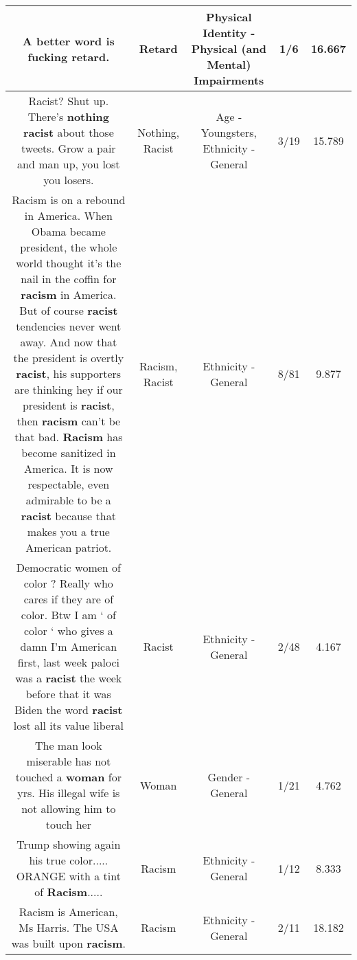 \documentclass[11pt]{article}
\newlength\mylength
\begin{document}
\begin{center}
\begin{longtable}{|C{.65\mylength}|C{.30\mylength}|C{.12\mylength}|C{.12\mylength}|C{.12\mylength}|}
  \small A better word is fucking \textbf{retard}.\normalsize   & Retard & Physical Identity - Physical (and Mental) Impairments & 1/6 & 16.667 \\  \hline
  \small Racist? Shut up. There's \textbf{nothing} \textbf{racist} about those tweets. Grow a pair and man up, you lost you losers.\normalsize   & Nothing, Racist & Age - Youngsters, Ethnicity - General & 3/19 & 15.789 \\  \hline
  \small Racism is on a rebound in America. When Obama  became president, the whole world thought it's the nail in the coffin for \textbf{racism} in America. But of course \textbf{racist} tendencies never went away. And now that the president is overtly \textbf{racist}, his supporters are thinking hey if our president is \textbf{racist}, then \textbf{racism} can't be that bad. \textbf{Racism} has become sanitized in America. It is now respectable, even admirable to be a \textbf{racist} because that makes you a true American patriot.\normalsize   & Racism, Racist & Ethnicity - General & 8/81 & 9.877 \\  \hline
  \small Democratic women of color ? Really who cares if they are of color. Btw I am ‘ of color ‘ who gives a damn I'm American first, last week paloci was a \textbf{racist} the week before that it was Biden the word \textbf{racist} lost all its value liberal\normalsize   & Racist & Ethnicity - General & 2/48 & 4.167 \\  \hline
  \small The man look miserable has not touched a \textbf{woman} for yrs. His illegal wife is not allowing him to touch her\normalsize   & Woman & Gender - General & 1/21 & 4.762 \\  \hline
  \small Trump showing again his true color..... ORANGE with a tint of \textbf{Racism}.....\normalsize   & Racism & Ethnicity - General & 1/12 & 8.333 \\  \hline
  \small Racism is American, Ms Harris. The USA was built upon \textbf{racism}.\normalsize   & Racism & Ethnicity - General & 2/11 & 18.182 \\  \hline

\end{longtable}
\end{center}
\end{document}
